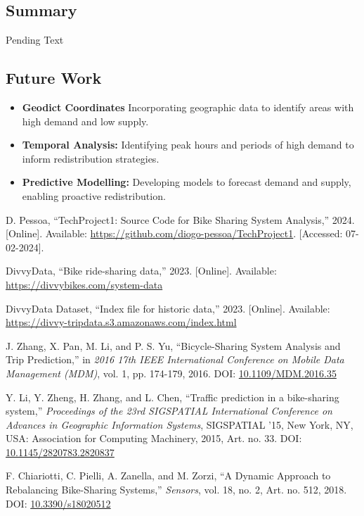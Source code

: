 \subsection{Summary}\label{subsec:summary}
Pending Text

\subsection{Future Work}\label{subsec:future-work}
\begin{itemize}
    \item \textbf{Geodict Coordinates} Incorporating geographic data to identify areas with high demand and low supply.
    \item \textbf{Temporal Analysis:} Identifying peak hours and periods of high demand to inform redistribution strategies.
    \item \textbf{Predictive Modelling:} Developing models to forecast demand and supply, enabling proactive redistribution.
\end{itemize}
\begin{thebibliography}{24}

    D. Pessoa, ``TechProject1: Source Code for Bike Sharing System Analysis,'' 2024.
    [Online].
    Available: \url{https://github.com/diogo-pessoa/TechProject1}.
    [Accessed: 07-02-2024].

    DivvyData, ``Bike ride-sharing data,'' 2023.
    [Online].
    Available: \url{https://divvybikes.com/system-data}

    DivvyData Dataset, ``Index file for historic data,'' 2023.
    [Online].
    Available: \url{https://divvy-tripdata.s3.amazonaws.com/index.html}

    J. Zhang, X. Pan, M. Li, and P. S. Yu, ``Bicycle-Sharing System Analysis and Trip Prediction,'' in \textit{2016 17th IEEE International Conference on Mobile Data Management (MDM)}, vol.
    1, pp.
    174-179, 2016.
    DOI: \href{https://doi.org/10.1109/MDM.2016.35}{10.1109/MDM.2016.35}

    Y. Li, Y. Zheng, H. Zhang, and L. Chen, ``Traffic prediction in a bike-sharing system,'' \textit{Proceedings of the 23rd SIGSPATIAL International Conference on Advances in Geographic Information Systems}, SIGSPATIAL '15, New York, NY, USA: Association for Computing Machinery, 2015, Art.
    no.
    33.
    DOI: \href{https://doi.org/10.1145/2820783.2820837}{10.1145/2820783.2820837}

    F. Chiariotti, C. Pielli, A. Zanella, and M. Zorzi, ``A Dynamic Approach to Rebalancing Bike-Sharing Systems,'' \textit{Sensors}, vol.
    18, no.
            2, Art.
            no.
            512, 2018.
            DOI: \href{https://www.mdpi.com/1424-8220/18/2/512}{10.3390/s18020512}

\end{thebibliography}
